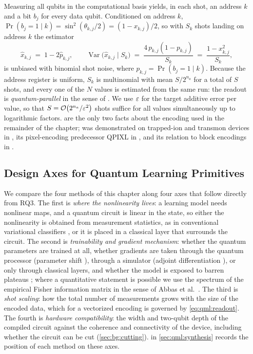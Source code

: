 Measuring all qubits in the computational basis yields, in each shot, an address $k$ and a bit $b_j$ for every data qubit. Conditioned on address $k$, $\Pr(b_j = 1 \mid k) = \sin^2(\theta_{k,j}/2) = (1 - x_{k,j})/2$, so with $S_k$ shots landing on address $k$ the estimator
\begin{equation}\label{eq:qml:readout}
\hat{x}_{k,j} \;=\; 1 - 2\hat{p}_{k,j}, \qquad
\operatorname{Var}\big(\hat{x}_{k,j} \mid S_k\big) \;=\; \frac{4\,p_{k,j}(1-p_{k,j})}{S_k} \;=\; \frac{1 - x_{k,j}^2}{S_k},
\end{equation}
is unbiased with binomial shot noise, where $p_{k,j} = \Pr(b_j = 1 \mid k)$. Because the address register is uniform, $S_k$ is multinomial with mean $S/2^{n_a}$ for a total of $S$ shots, and every one of the $N$ values is estimated from the same run: the readout is \emph{quantum-parallel} in the sense of \cite{balewski2024qcrank}. We use $\varepsilon$ for the target additive error per value, so that $S = \mathcal{O}\!\left(2^{n_a}/\varepsilon^2\right)$ shots suffice for all values simultaneously up to logarithmic factors.  are the only two facts about the encoding used in the remainder of the chapter; \qcrank{} was demonstrated on trapped-ion and transmon devices in \cite{balewski2024qcrank}, its pixel-encoding predecessor QPIXL in \cite{amankwah2022qpixl}, and its relation to block encodings in \cite{camps2022fable}.

\subsection{Design Axes for Quantum Learning Primitives}\label{sec:qml:prelim:axes}

We compare the four methods of this chapter along four axes that follow directly from RQ3. The first is \emph{where the nonlinearity lives}: a learning model needs nonlinear maps, and a quantum circuit is linear in the state, so either the nonlinearity is obtained from measurement statistics, as in conventional variational classifiers \cite{schuld2020circuitcentric,perezsalinas2020reuploading}, or it is placed in a classical layer that surrounds the circuit. The second is \emph{trainability and gradient mechanism}: whether the quantum parameters are trained at all, whether gradients are taken through the quantum processor (parameter shift \cite{crooks2019parametershift}), through a simulator (adjoint differentiation \cite{jones2020adjoint}), or only through classical layers, and whether the model is exposed to barren plateaus \cite{mcclean2018barren}; where a quantitative statement is possible we use the spectrum of the empirical Fisher information matrix in the sense of Abbas et al.~\cite{abbas2021powerqnn}. The third is \emph{shot scaling}: how the total number of measurements grows with the size of the encoded data, which for a vectorized encoding is governed by \cref{eq:qml:readout}. The fourth is \emph{hardware compatibility}: the width and two-qubit depth of the compiled circuit against the coherence and connectivity of the device, including whether the circuit can be cut (\cref{sec:bg:cutting}).  in \cref{sec:qml:synthesis} records the position of each method on these axes.

